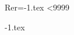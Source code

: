 \documentclass{article}
\begin{document}
\newcount\tata
Rer\immediate\openout\toto=\jobname-1.tex
\@whilenum\tata<9999
\immediate\closeout\toto
\immediate\closeout\toto

\jobname-1.tex

\showthe\pdfelapsedtime
\end{document}
